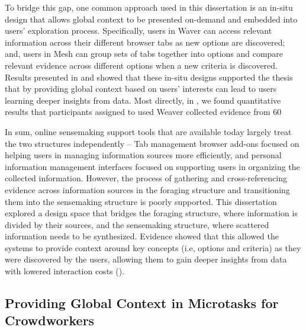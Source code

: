 To bridge this gap, one common approach used in this dissertation is an in-situ design that allows global context to be presented on-demand and embedded into users’ exploration process. Specifically, users in Waver can access relevant information across their different browser tabs as new options are discovered; and, users in Mesh can group sets of tabs together into options and compare relevant evidence across different options when a new criteria is discovered.  Results presented in  and  showed that these in-situ designs supported the thesis that by providing global context based on users’ interests can lead to users learning deeper insights from data. Most directly, in , we found quantitative results that participants assigned to used Weaver collected evidence from 60%

In sum, online sensemaking support tools that are available today largely treat the two structures independently -- Tab management browser add-ons focused on helping users in managing information sources more efficiently, and personal information management interfaces focused on supporting users in organizing the collected information. However, the process of gathering and cross-referencing evidence across information sources in the foraging structure and transitioning them into the sensemaking structure is poorly supported. This dissertation explored a design space that bridges the foraging structure, where information is divided by their sources, and the sensemaking structure, where scattered information needs to be synthesized. Evidence showed that this allowed the systems to provide context around key concepts (i.e, options and criteria) as they were discovered by the users, allowing them to gain deeper insights from data with lowered interaction costs ().

\subsection{Providing Global Context in Microtasks for Crowdworkers}

